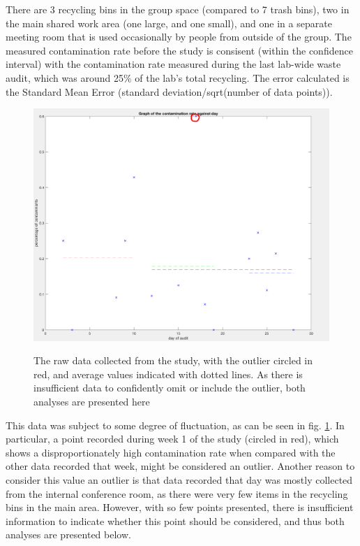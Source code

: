 \documentclass[nofonts,nols,justified,nobib]{tufte-book}
\begin{document}
There are 3 recycling bins in the group space (compared to 7 trash bins), two in the main shared work area (one large, and one small), and one in a separate meeting room that is used occasionally by people from outside of the group. The measured contamination rate before the study is consisent (within the confidence interval) with the contamination rate measured during the last lab-wide waste audit, which was around 25\% of the lab's total recycling. The error calculated is the Standard Mean Error (standard deviation/sqrt(number of data points)).

\begin{figure}
  \caption{The raw data collected from the study, with the outlier circled in red, and average values indicated with dotted lines. As there is insufficient data to confidently omit or include the outlier, both analyses are presented here}
  \includegraphics[width=1\linewidth]{img/4/finalresults/showing-outlier.png}
  \label{rawpoints}
\end{figure}

This data was subject to some degree of fluctuation, as can be seen in fig. \ref{rawpoints}. In particular, a point recorded during week 1 of the study (circled in red), which shows a disproportionately high contamination rate when compared with the other data recorded that week, might be considered an outlier. Another reason to consider this value an outlier is that data recorded that day was mostly collected from the internal conference room, as there were very few items in the recycling bins in the main area. However, with so few points presented, there is insufficient information to indicate whether this point should be considered, and thus both analyses are presented below.
\end{document}
